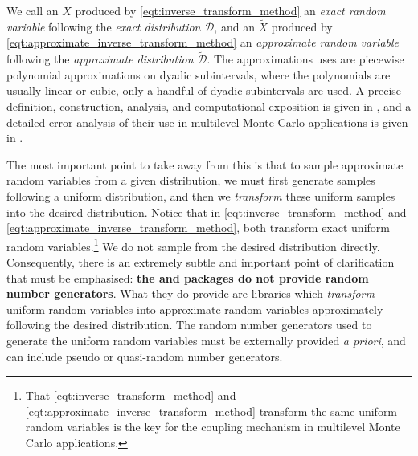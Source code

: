 We call an \( X \) produced by \cref{eqt:inverse_transform_method} an \textit{exact random variable} following the \textit{exact distribution} \( \mathcal{D} \), and an \( \widetilde{X} \) produced by \cref{eqt:approximate_inverse_transform_method} an \textit{approximate random variable} following the \textit{approximate distribution} \( \widetilde{\mathcal{D}} \). 
The approximations \arv uses are piecewise polynomial approximations on dyadic subintervals, where the polynomials are usually linear or cubic, only a handful of dyadic subintervals are used. A precise definition, construction, analysis, and computational exposition is given in \citep{giles2023approximating}, and a detailed error analysis of their use in multilevel Monte Carlo applications is given in \citep{giles2022approximate}. 

The most important point to take away from this is that to sample approximate random variables from a given distribution, we must first generate samples following a uniform distribution, and then we \textit{transform} these uniform samples into the desired distribution. Notice that in \cref{eqt:inverse_transform_method} and \cref{eqt:approximate_inverse_transform_method}, both transform exact uniform random variables.\footnote{That \cref{eqt:inverse_transform_method} and \cref{eqt:approximate_inverse_transform_method} transform the same uniform random variables is the key for the coupling mechanism in multilevel Monte Carlo applications.} We do not sample from the desired distribution directly. Consequently, there is an extremely subtle and important point of clarification that must be emphasised: \textbf{the \arv and \pyarv packages do not provide random number generators}. What they do provide are libraries which \emph{transform} uniform random variables into approximate random variables approximately following the desired distribution. The random number generators used to generate the uniform random variables must be externally provided \textit{a priori}, and can include pseudo or quasi-random number generators.

